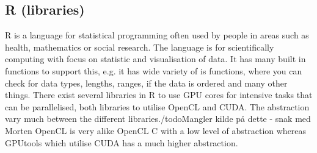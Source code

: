 \subsection{R (libraries)} %
R is a language for statistical programming often used by people in areas such as health, mathematics or social research.
The language is for scientifically computing with focus on statistic and visualisation of data.
It has many built in functions to support this, e.g. it has wide variety of is functions, where you can check for data types, lengths, ranges, if the data is ordered and many other things.
There exist several libraries in R to use GPU cores for intensive tasks that can be parallelised, both libraries to utilise OpenCL and CUDA. 
The abstraction vary much between the different libraries./todo{Mangler kilde på dette - snak med Morten}
OpenCL is very alike OpenCL C with a low level of abstraction whereas GPUtools which utilise CUDA has a much higher abstraction.\citep{R_history,R_speed}




